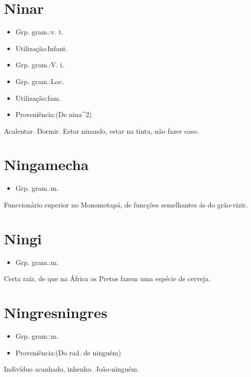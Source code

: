 \section{Ninar}
\begin{itemize}
\item {Grp. gram.:v. t.}
\end{itemize}
\begin{itemize}
\item {Utilização:Infant.}
\end{itemize}
\begin{itemize}
\item {Grp. gram.:V. i.}
\end{itemize}
\begin{itemize}
\item {Grp. gram.:Loc.}
\end{itemize}
\begin{itemize}
\item {Utilização:fam.}
\end{itemize}
\begin{itemize}
\item {Proveniência:(De \textunderscore nina\textunderscore ^2)}
\end{itemize}
Acalentar.
Dormir.
\textunderscore Estar ninando\textunderscore , estar na tinta, não fazer caso.
\section{Ningamecha}
\begin{itemize}
\item {Grp. gram.:m.}
\end{itemize}
Funccionário superior no Monomotapá, de funcções semelhantes ás do grão-vizir.
\section{Ningi}
\begin{itemize}
\item {Grp. gram.:m.}
\end{itemize}
Certa raíz, de que na África os Pretos fazem uma espécie de cerveja.
\section{Ningresningres}
\begin{itemize}
\item {Grp. gram.:m.}
\end{itemize}
\begin{itemize}
\item {Proveniência:(Do rad. de \textunderscore ninguém\textunderscore )}
\end{itemize}
Indivíduo acanhado, inhenho.
João-ninguém.
